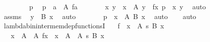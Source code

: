 \begin{isabellebody}
\ \ \isamarkupfalse%
\isanewline
\ \ \ \ \isamarkupfalse%
\ p\ \isamarkupfalse%
\ {\isachardoublequoteopen}p\ {\isasymin}\ {\isasymlambda}a\ {\isasymin}\ A{\isacharprime}{\kern0pt}{\isachardot}{\kern0pt}\ f{\isacharbackquote}{\kern0pt}a{\isachardoublequoteclose}\isanewline
\ \ \ \ \isamarkupfalse%
\ \isamarkupfalse%
\ x\ y\ \ {\isachardoublequoteopen}x\ {\isasymin}\ A{\isacharprime}{\kern0pt}{\isachardoublequoteclose}\ {\isachardoublequoteopen}y\ {\isasymin}\ {\isacharbraceleft}{\kern0pt}f{\isacharbackquote}{\kern0pt}x{\isacharbraceright}{\kern0pt}{\isachardoublequoteclose}\ {\isachardoublequoteopen}p\ {\isacharequal}{\kern0pt}\ {\isasymlangle}x{\isacharcomma}{\kern0pt}\ y{\isasymrangle}{\isachardoublequoteclose}\ \isamarkupfalse%
\ auto\isanewline
\ \ \ \ \isamarkupfalse%
\ \isamarkupfalse%
\ assms\ \isamarkupfalse%
\ {\isachardoublequoteopen}y\ {\isasymin}\ B\ x{\isachardoublequoteclose}\ \isamarkupfalse%
\ auto\isanewline
\ \ \ \ \isamarkupfalse%
\ \isamarkupfalse%
\ {\isachardoublequoteopen}p\ {\isasymin}\ {\isasymSum}x\ {\isasymin}\ A{\isacharprime}{\kern0pt}{\isachardot}{\kern0pt}\ {\isacharparenleft}{\kern0pt}B\ x{\isacharparenright}{\kern0pt}{\isachardoublequoteclose}\ \isamarkupfalse%
\ auto\isanewline
\ \ \isamarkupfalse%
\isanewline
{}\isamarkupfalse%
\ auto%
\endisatagproof
{\isafoldproof}%
%
\isadelimproof
\isanewline
%
\endisadelimproof
\isanewline
{}\isamarkupfalse%
\ lambda{\isacharunderscore}{\kern0pt}bin{\isacharunderscore}{\kern0pt}inter{\isacharunderscore}{\kern0pt}mem{\isacharunderscore}{\kern0pt}dep{\isacharunderscore}{\kern0pt}functionsI{\isacharcolon}{\kern0pt}\isanewline
\ \ \ {\isachardoublequoteopen}f\ {\isasymin}\ {\isacharparenleft}{\kern0pt}x\ {\isasymin}\ A{\isacharparenright}{\kern0pt}\ {\isasymrightarrow}s\ {\isacharparenleft}{\kern0pt}B\ x{\isacharparenright}{\kern0pt}{\isachardoublequoteclose}\isanewline
\ \ \ {\isachardoublequoteopen}{\isacharparenleft}{\kern0pt}{\isasymlambda}x\ {\isasymin}\ A\ {\isasyminter}\ A{\isacharprime}{\kern0pt}{\isachardot}{\kern0pt}\ f{\isacharbackquote}{\kern0pt}x{\isacharparenright}{\kern0pt}\ {\isasymin}\ {\isacharparenleft}{\kern0pt}x\ {\isasymin}\ A\ {\isasyminter}\ A{\isacharprime}{\kern0pt}{\isacharparenright}{\kern0pt}\ {\isasymrightarrow}s\ {\isacharparenleft}{\kern0pt}B\ x{\isacharparenright}{\kern0pt}{\isachardoublequoteclose}\isanewline

\end{isabellebody}
